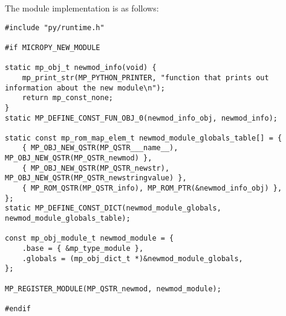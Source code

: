 \documentclass[twoside, 12pt]{article}
\begin{document}
The module implementation is as follows:
\begin{lstlisting}[caption={Implementing a new module for the Zephyr port, Part 3},breaklines=true]
#include "py/runtime.h"

#if MICROPY_NEW_MODULE

static mp_obj_t newmod_info(void) {
    mp_print_str(MP_PYTHON_PRINTER, "function that prints out information about the new module\n");
    return mp_const_none;
}
static MP_DEFINE_CONST_FUN_OBJ_0(newmod_info_obj, newmod_info);

static const mp_rom_map_elem_t newmod_module_globals_table[] = {
    { MP_OBJ_NEW_QSTR(MP_QSTR___name__), MP_OBJ_NEW_QSTR(MP_QSTR_newmod) },
    { MP_OBJ_NEW_QSTR(MP_QSTR_newstr), MP_OBJ_NEW_QSTR(MP_QSTR_newstringvalue) },
    { MP_ROM_QSTR(MP_QSTR_info), MP_ROM_PTR(&newmod_info_obj) },
};
static MP_DEFINE_CONST_DICT(newmod_module_globals, newmod_module_globals_table);

const mp_obj_module_t newmod_module = {
    .base = { &mp_type_module },
    .globals = (mp_obj_dict_t *)&newmod_module_globals,
};

MP_REGISTER_MODULE(MP_QSTR_newmod, newmod_module);

#endif
\end{lstlisting}
\end{document}
